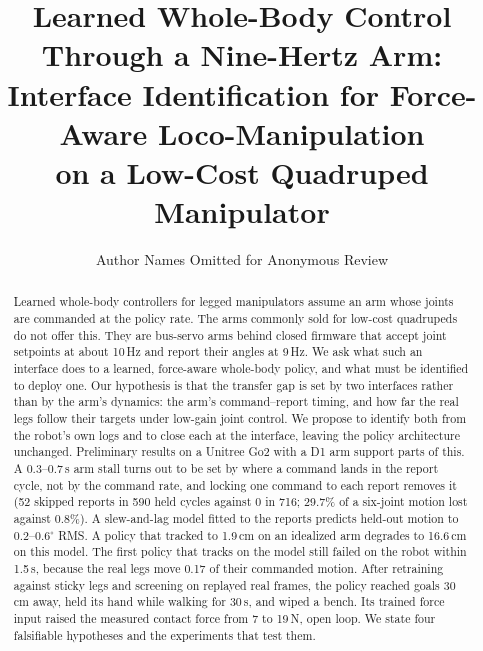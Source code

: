 \documentclass[conference]{IEEEtran}
\begin{document}
\title{Learned Whole-Body Control Through a Nine-Hertz Arm:\\
Interface Identification for Force-Aware Loco-Manipulation\\ on a Low-Cost Quadruped Manipulator}

\author{Author Names Omitted for Anonymous Review}

\maketitle

\begin{abstract}
Learned whole-body controllers for legged manipulators assume an arm whose joints are commanded at the policy rate.
The arms commonly sold for low-cost quadrupeds do not offer this. They are bus-servo arms behind closed firmware that
accept joint setpoints at about 10\,Hz and report their angles at 9\,Hz. We ask what such an interface does to a learned,
force-aware whole-body policy, and what must be identified to deploy one. Our hypothesis is that the transfer gap is set by
two interfaces rather than by the arm's dynamics: the arm's command--report timing, and how far the real legs follow their
targets under low-gain joint control. We propose to identify both from the robot's own logs and to close each at the
interface, leaving the policy architecture unchanged. Preliminary results on a Unitree Go2 with a D1 arm support
parts of this. A 0.3--0.7\,s arm stall turns out to be set by where a command lands in the report cycle, not by the
command rate, and locking one command to each report removes it (52 skipped reports in 590 held cycles against 0 in 716;
29.7\% of a six-joint motion lost against 0.8\%). A slew-and-lag model fitted to the reports predicts held-out motion
to 0.2--0.6$^\circ$ RMS. A policy that tracked to 1.9\,cm on an idealized arm degrades to 16.6\,cm on this model.
The first policy that tracks on the model still failed on the robot within 1.5\,s, because the real legs move 0.17 of
their commanded motion. After retraining against sticky legs and screening on replayed real frames, the policy reached
goals 30\,cm away, held its hand while walking for 30\,s, and wiped a bench. Its trained force input raised the
measured contact force from 7 to 19\,N, open loop. We state four falsifiable hypotheses and the experiments that test them.
\end{abstract}

\IEEEpeerreviewmaketitle

\end{document}
